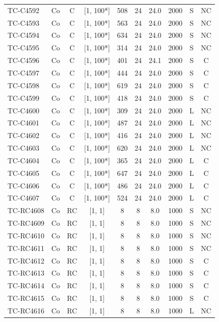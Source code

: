 \begin{longtable}{lccccccccc}
TC-C4592 & Co & C & [1, 100*] & 508 & 24 & 24.0 & 2000 & S & NC \\
TC-C4593 & Co & C & [1, 100*] & 563 & 24 & 24.0 & 2000 & S & NC \\
TC-C4594 & Co & C & [1, 100*] & 634 & 24 & 24.0 & 2000 & S & NC \\
TC-C4595 & Co & C & [1, 100*] & 314 & 24 & 24.0 & 2000 & S & NC \\
TC-C4596 & Co & C & [1, 100*] & 401 & 24 & 24.1 & 2000 & S & C \\
TC-C4597 & Co & C & [1, 100*] & 444 & 24 & 24.0 & 2000 & S & C \\
TC-C4598 & Co & C & [1, 100*] & 619 & 24 & 24.0 & 2000 & S & C \\
TC-C4599 & Co & C & [1, 100*] & 418 & 24 & 24.0 & 2000 & S & C \\
TC-C4600 & Co & C & [1, 100*] & 309 & 24 & 24.0 & 2000 & L & NC \\
TC-C4601 & Co & C & [1, 100*] & 487 & 24 & 24.0 & 2000 & L & NC \\
TC-C4602 & Co & C & [1, 100*] & 416 & 24 & 24.0 & 2000 & L & NC \\
TC-C4603 & Co & C & [1, 100*] & 620 & 24 & 24.0 & 2000 & L & NC \\
TC-C4604 & Co & C & [1, 100*] & 365 & 24 & 24.0 & 2000 & L & C \\
TC-C4605 & Co & C & [1, 100*] & 647 & 24 & 24.0 & 2000 & L & C \\
TC-C4606 & Co & C & [1, 100*] & 486 & 24 & 24.0 & 2000 & L & C \\
TC-C4607 & Co & C & [1, 100*] & 524 & 24 & 24.0 & 2000 & L & C \\
TC-RC4608 & Co & RC & [1, 1] & 8 & 8 & 8.0 & 1000 & S & NC \\
TC-RC4609 & Co & RC & [1, 1] & 8 & 8 & 8.0 & 1000 & S & NC \\
TC-RC4610 & Co & RC & [1, 1] & 8 & 8 & 8.0 & 1000 & S & NC \\
TC-RC4611 & Co & RC & [1, 1] & 8 & 8 & 8.0 & 1000 & S & NC \\
TC-RC4612 & Co & RC & [1, 1] & 8 & 8 & 8.0 & 1000 & S & C \\
TC-RC4613 & Co & RC & [1, 1] & 8 & 8 & 8.0 & 1000 & S & C \\
TC-RC4614 & Co & RC & [1, 1] & 8 & 8 & 8.0 & 1000 & S & C \\
TC-RC4615 & Co & RC & [1, 1] & 8 & 8 & 8.0 & 1000 & S & C \\
TC-RC4616 & Co & RC & [1, 1] & 8 & 8 & 8.0 & 1000 & L & NC \\

\end{longtable}
